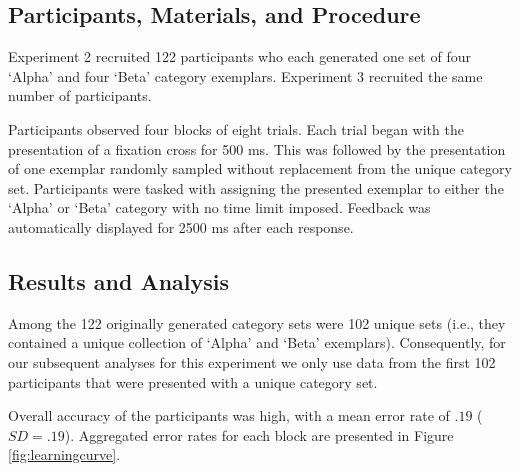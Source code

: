 \documentclass[12pt]{article}
\begin{document}
\begin{flushleft}
\subsection{Participants, Materials, and Procedure}

Experiment 2 recruited 122 participants who each generated one set of four `Alpha'
and four `Beta' category exemplars. Experiment 3 recruited the same number of
participants.

Participants observed four blocks of eight trials. Each trial began with the
presentation of a fixation cross for 500 ms. This was followed by the
presentation of one exemplar randomly sampled without replacement from the
unique category set. Participants were tasked with assigning the presented
exemplar to either the `Alpha' or `Beta' category with no time limit imposed.
Feedback was automatically displayed for 2500 ms after each response.

\subsection{Results and Analysis}

Among the 122 originally generated category sets were 102 unique sets (i.e.,
they contained a unique collection of `Alpha' and `Beta' exemplars). Consequently,
for our subsequent analyses for this experiment we only use data from the first
102 participants that were presented with a unique category set.

Overall accuracy of the participants was high, with a mean error rate of $.19$
($SD = .19$). Aggregated error rates for each block are presented in Figure
\ref{fig:learningcurve}.


\end{flushleft}
\end{document}
